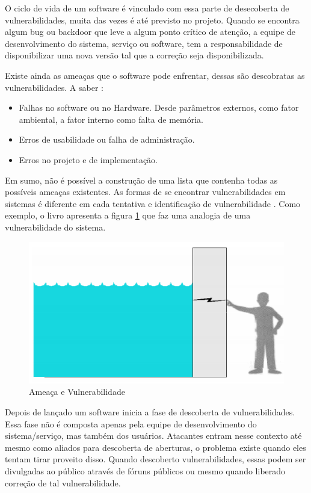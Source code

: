 O ciclo de vida de um software é vinculado com essa parte de desecoberta de vulnerabilidades, muita das vezes é até previsto no projeto. Quando se encontra algum bug ou backdoor que leve a algum ponto crítico de atenção, a equipe de desenvolvimento do sistema, serviço ou software, tem a responsabilidade de disponibilizar uma nova versão tal que a correção seja disponibilizada.

Existe ainda as ameaças que o software pode enfrentar, dessas são descobratas as vulnerabilidades. A saber \cite{Pfleeger2015}:

\begin{itemize}
\item Falhas no software ou no Hardware. Desde parâmetros externos, como fator ambiental, a fator interno como falta de memória.
\item Erros de usabilidade ou falha de administração.
\item Erros no projeto e de implementação.
\end{itemize}

Em sumo, não é possível a construção de uma lista que contenha todas as possíveis ameaças existentes. As formas de se encontrar vulnerabilidades em sistemas é diferente em cada tentativa e identificação de vulnerabilidade \cite{Pfleeger2015}. Como exemplo, o livro  apresenta a figura \ref{fig:vulnerabilidadeAgua} que faz uma analogia de uma vulnerabilidade do sistema.

\begin{figure}[H]
\centering
\includegraphics[width=1\textwidth]{imagens/vulnerabilidadeAgua.png}
\caption{Ameaça e Vulnerabilidade \cite{Pfleeger2015}}
\label{fig:vulnerabilidadeAgua}
\end{figure}

Depois de lançado um software inicia a fase de descoberta de vulnerabilidades. Essa fase não é composta apenas pela equipe de desenvolvimento do sistema/serviço, mas também dos usuários. Atacantes entram nesse contexto até mesmo como aliados para descoberta de aberturas, o problema existe quando eles tentam tirar proveito disso. Quando descoberto vulnerabilidades, essas podem ser divulgadas ao público através de fóruns públicos ou mesmo quando liberado correção de tal vulnerabilidade.

